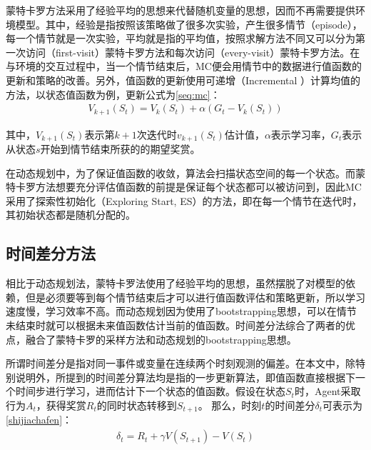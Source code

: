 蒙特卡罗方法采用了经验平均的思想来代替随机变量的思想，因而不再需要提供环境模型。其中，经验是指按照该策略做了很多次实验，产生很多情节（episode），每一个情节就是一次实验，平均就是指的平均值，按照求解方法不同又可以分为第一次访问（first-visit）蒙特卡罗方法和每次访问（every-visit）蒙特卡罗方法。在与环境的交互过程中，当一个情节结束后，MC便会用情节中的数据进行值函数的更新和策略的改善。另外，值函数的更新使用可递增（Incremental ）计算均值的方法，以状态值函数为例，更新公式为\eqref{seq:mc}：
\begin{equation}\label{seq:mc}
\begin{aligned}
V_{k+1}(S_{t})=V_{k}(S_{t})+ \alpha(G_{t}-V_{k}(S_{t}))
\end{aligned}
\end{equation}

其中，$V_{k+1}(S_{t})$表示第$k+1$次迭代时$v_{k+1}(S_{t})$估计值，$\alpha$表示学习率，$G_{t}$表示从状态$s$开始到情节结束所获的的期望奖赏。

在动态规划中，为了保证值函数的收敛，算法会扫描状态空间的每一个状态。而蒙特卡罗方法想要充分评估值函数的前提是保证每个状态都可以被访问到，因此MC采用了探索性初始化（Exploring Start, ES）的方法，即在每一个情节在迭代时，其初始状态都是随机分配的。

\subsection{时间差分方法}
相比于动态规划法，蒙特卡罗法使用了经验平均的思想，虽然摆脱了对模型的依赖，但是必须要等到每个情节结束后才可以进行值函数评估和策略更新，所以学习速度慢，学习效率不高。而动态规划因为使用了bootstrapping思想，可以在情节未结束时就可以根据未来值函数估计当前的值函数。时间差分法综合了两者的优点，融合了蒙特卡罗的采样方法和动态规划的bootstrapping思想。

所谓时间差分是指对同一事件或变量在连续两个时刻观测的偏差。在本文中，除特别说明外，所提到的时间差分算法均是指的一步更新算法，即值函数直接根据下一个时间步进行学习，进而估计下一个状态的值函数。假设在状态$S_{t}$时，Agent采取行为$A_{t}$，获得奖赏$R_{t}$的同时状态转移到$S_{t+1}$。
那么，时刻$t$的时间差分$\delta_{t}$可表示为\eqref{shijiachafen}：
\begin{equation}\label{shijiachafen}
\begin{aligned}
\delta_{t}=R_{t}+\gamma V(S_{t+1})-V(S_{t})
\end{aligned}
\end{equation}

